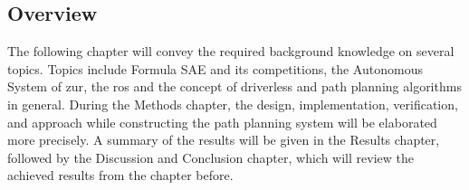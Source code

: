 \subsection{Overview} \label{sec:Overview}
The following chapter will convey the required background knowledge on several topics. Topics include Formula SAE and its competitions, the Autonomous System of \acrlong{zur}, the \acrlong{ros} and the concept of driverless and path planning algorithms in general. During the Methods chapter, the design, implementation, verification, and approach while constructing the path planning system will be elaborated more precisely. A summary of the results will be given in the Results chapter, followed by the Discussion and Conclusion chapter, which will review the achieved results from the chapter before.
